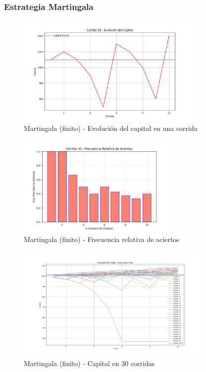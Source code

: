 \documentclass{article}
\begin{document}
\subsubsection*{Estrategia Martingala}


\begin{figure}[H]
    \centering
    \includegraphics[width=0.8\textwidth]{./images/capital_corrida_30_m_f.png}
    \caption{Martingala (finito) - Evolución del capital en una corrida}
\end{figure}

\begin{figure}[H]
    \centering
    \includegraphics[width=0.7\textwidth]{./images/frsa_corrida_30_m_f.png}
    \caption{Martingala (finito) - Frecuencia relativa de aciertos}
\end{figure}

\begin{figure}[H]
    \centering
    \includegraphics[width=0.85\textwidth]{./images/capital_todas_corridas_m_f.png}
    \caption{Martingala (finito) - Capital en 30 corridas}
\end{figure}
\end{document}
